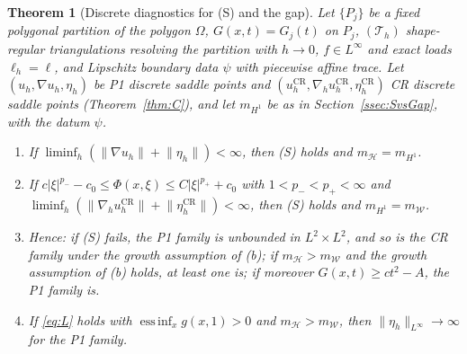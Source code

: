 \documentclass[11pt]{amsart}
\newtheorem{theorem}{Theorem}[section]
\theoremstyle{definition}
\theoremstyle{remark}
\numberwithin{equation}{section}
\newcommand{\abs}[1]{\lvert #1\rvert}
\newcommand{\norm}[1]{\lVert #1\rVert}
\newcommand{\CR}{\mathrm{CR}}
\newcommand{\Th}{\mathcal T_h}
\newcommand{\mW}{m_{\mathcal W}}
\newcommand{\mH}{m_{\mathcal H}}
\newcommand{\mHone}{m_{H^1}}
\DeclareMathOperator*{\essinf}{ess\,inf}
\begin{document}
\begin{theorem}[Discrete diagnostics for (S) and the gap]\label{thm:diag}
Let $\{P_j\}$ be a fixed polygonal partition of the polygon $\Omega$, $G(x,t)=G_j(t)$ on $P_j$, $(\Th)$ shape-regular triangulations resolving the partition with $h\to0$, $f\in L^\infty$ and exact loads $\ell_h=\ell$, and Lipschitz boundary data $\psi$ with piecewise affine trace. Let $(u_h,\nabla u_h,\eta_h)$ be P1 discrete saddle points and $(u_h^{\CR},\nabla_hu_h^{\CR},\eta_h^{\CR})$ CR discrete saddle points \textup(Theorem~\ref{thm:C}\textup), and let $\mHone$ be as in Section~\ref{ssec:SvsGap}, with the datum $\psi$.
\begin{enumerate}[label=\textup{(\alph*)}]
\item If $\liminf_h(\norm{\nabla u_h}+\norm{\eta_h})<\infty$, then \textup{(S)} holds and $\mH=\mHone$.
\item If $c\abs\xi^{p_-}-c_0\le\Phi(x,\xi)\le C\abs\xi^{p_+}+c_0$ with $1<p_-<p_+<\infty$ and $\liminf_h(\norm{\nabla_hu^{\CR}_h}+\norm{\eta^{\CR}_h})<\infty$, then \textup{(S)} holds and $\mHone=\mW$.
\item Hence: if \textup{(S)} fails, the P1 family is unbounded in $L^2\times L^2$, and so is the CR family under the growth assumption of (b); if $\mH>\mW$ and the growth assumption of (b) holds, at least one is; if moreover $G(x,t)\ge ct^2-A$, the P1 family is.
\item If \eqref{eq:L} holds with $\essinf_xg(x,1)>0$ and $\mH>\mW$, then $\norm{\eta_h}_{L^\infty}\to\infty$ for the P1 family.
\end{enumerate}
\end{theorem}
\end{document}
